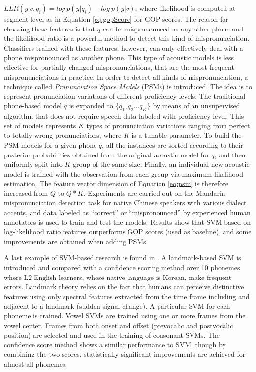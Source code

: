 $LLR(y|q,q_{i})=log \ p(y|q_{i}) - log \ p(y|q)$, where likelihood is computed at segment
level as in Equation \ref{eq:gopScore} for GOP scores. The reason for choosing these features is
that $q$ can be mispronounced as any other phone and the likelihood ratio is a powerful
method to detect this kind of mispronunciation. Classifiers trained with these features, however,
can only effectively deal with a phone mispronounced as another phone. This type of acoustic models is
less effective for partially changed mispronunciations, that are the most frequent mispronunciations
in practice. In order to detect all kinds of mispronunciation, a technique called
\textit{Pronunciation Space Models} (PSMs) is introduced. The idea is to represent pronunciation variations
of different proficiency levels. The traditional phone-based model $q$ is expanded to
\{$q_{1}, q_{2} \dotsc q_{K}$\} by means of an unsupervised algorithm that does not require
speech data labeled with proficiency level.
This set of models represents $K$ types of pronunciation variations ranging from perfect to
totally wrong pronunciations, where $K$ is a tunable parameter. To build the PSM models for a
given phone $q$, all the instances are sorted according to their
posterior probabilities obtained from the original acoustic model for $q$, and
then uniformly split into $K$ group of the same size. Finally, an individual new acoustic
model is trained with the observation from each group via maximum likelihood estimation.
The feature vector dimension of Equation
\ref{eq:psm} is therefore increased from $Q$ to $Q*K$.
Experiments are carried out on the
Mandarin mispronunciation detection task for native Chinese speakers with various dialect accents,
and data labeled as ``correct'' or ``mispronounced'' by experienced human annotators is used to train and test the models.
Results show that SVM based on log-likelihood ratio features outperforms GOP scores (used as baseline), and some
improvements are obtained when adding PSMs.

A last example of SVM-based research is found in \cite{landmark_svm, landmark_svm_2}.
A landmark-based SVM is introduced and compared with a confidence
scoring method over 10 phonemes where
L2 English learners, whose native language is Korean, make frequent errors.
Landmark theory relies on the fact that humans can perceive distinctive
features using only spectral features extracted from the time frame including and adjacent to
a landmark (sudden signal change). A particular SVM for each phoneme is trained. Vowel SVMs are
trained using one or more frames from the vowel center. Frames from both onset and offset
(prevocalic and postvocalic position) are selected and used in the training of consonant
SVMs. The confidence score method shows a similar performance to SVM, though by combining
the two scores, statistically significant improvements are achieved for almost all phonemes.

